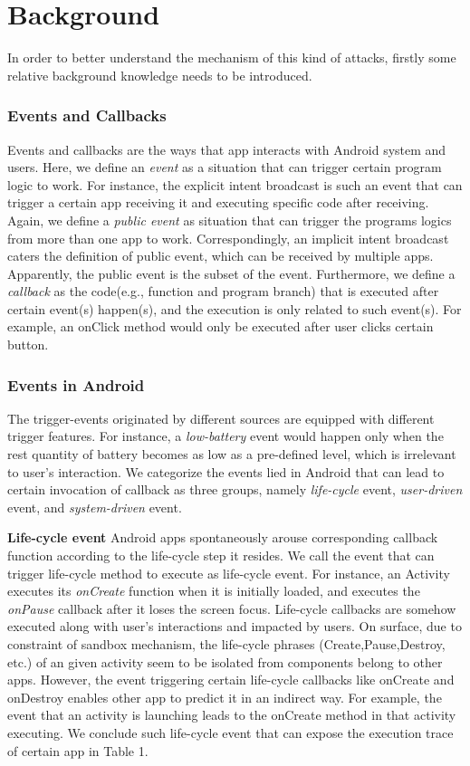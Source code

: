 \section{Background}
In order to better understand the mechanism of this kind of attacks, firstly some relative background knowledge needs to be introduced.

\subsubsection{Events and Callbacks}
Events and callbacks are the ways that app interacts with Android system and users. Here, we define an \textit{event} as a situation that can trigger certain program logic to work. For instance, the explicit intent broadcast is such an event that can trigger a certain app receiving it and executing specific code after receiving.
Again, we define a \textit{public event} as situation that can trigger the programs logics from more than one app to work. Correspondingly, an implicit intent broadcast caters the definition of public event, which can be received by multiple apps. Apparently, the public event is the subset of the event.
Furthermore, we define a \textit{callback} as the code(e.g., function and program branch) that is executed after certain event(s) happen(s), and the execution is only related to such event(s). For example, an onClick method would only be executed after user clicks certain button. 

\subsubsection{Events in Android}
The trigger-events originated by different sources are equipped with different trigger features. For instance, a \textit{low-battery} event would happen only when the rest quantity of battery becomes as low as a pre-defined level, which is irrelevant to user's interaction. We categorize the events lied in Android that can lead to certain invocation of callback as three groups, namely \textit{life-cycle} event, \textit{user-driven} event, and \textit{system-driven} event.

\textbf{Life-cycle event} Android apps spontaneously arouse corresponding callback function according to the life-cycle step it resides. We call the event that can trigger life-cycle method to execute as life-cycle event. For instance, an Activity executes its \textit{onCreate} function when it is initially loaded, and executes the \textit{onPause} callback after it loses the screen focus. Life-cycle callbacks are somehow executed along with user's interactions and impacted by users. On surface, due to constraint of sandbox mechanism, the life-cycle phrases (Create,Pause,Destroy, etc.) of an given activity seem to be isolated from components belong to other apps. However, the event triggering certain life-cycle callbacks like onCreate and onDestroy enables other app to predict it in an indirect way. For example, the event that an activity is launching leads to the onCreate method in that activity executing. We conclude such life-cycle event that can expose the execution trace of certain app in Table 1.

